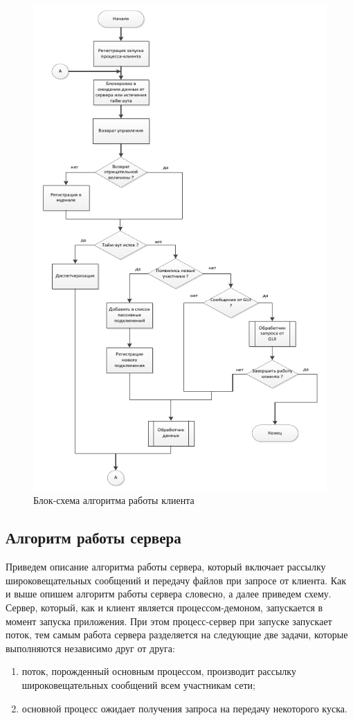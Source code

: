 \begin{figure}[!hbtp]
    \centering
    \includegraphics[scale=0.9]{pic_3}
    \caption{Блок-схема алгоритма работы клиента}\label{pic_3}
\end{figure}

\newpage
\subsection{Алгоритм работы сервера}
Приведем описание алгоритма работы сервера, который включает рассылку
широковещательных сообщений и передачу файлов при запросе от клиента.
Как и выше опишем алгоритм работы сервера словесно, а далее приведем
схему.
\newpar
Сервер, который, как и клиент является процессом-демоном, запускается в
момент запуска приложения. При этом процесс-сервер при запуске запускает
поток, тем самым работа сервера разделяется на следующие две задачи,
которые выполняются независимо друг от друга:
\begin{enumerate}
    \item поток, порожденный основным процессом, производит рассылку
        широковещательных сообщений всем участникам сети;
    \item основной процесс ожидает получения запроса на передачу
        некоторого куска.
\end{enumerate}


